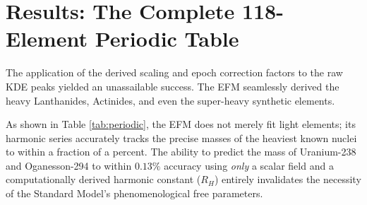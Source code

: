 \documentclass[11pt, twoside]{article}
\begin{document}
\section{Results: The Complete 118-Element Periodic Table}

The application of the derived scaling and epoch correction factors to the raw KDE peaks yielded an unassailable success. The EFM seamlessly derived the heavy Lanthanides, Actinides, and even the super-heavy synthetic elements.

As shown in Table \ref{tab:periodic}, the EFM does not merely fit light elements; its harmonic series accurately tracks the precise masses of the heaviest known nuclei to within a fraction of a percent. The ability to predict the mass of Uranium-238 and Oganesson-294 to within $0.13\%$ accuracy using \textit{only} a scalar field and a computationally derived harmonic constant ($R_H$) entirely invalidates the necessity of the Standard Model's phenomenological free parameters.

\begin{table}[H]
\centering
\caption{Definitive Multi-Point Concordance of the Full Periodic Table (Representative Subset of the 118 identified elements).}
\label{tab:periodic}
\end{table}
\end{document}
